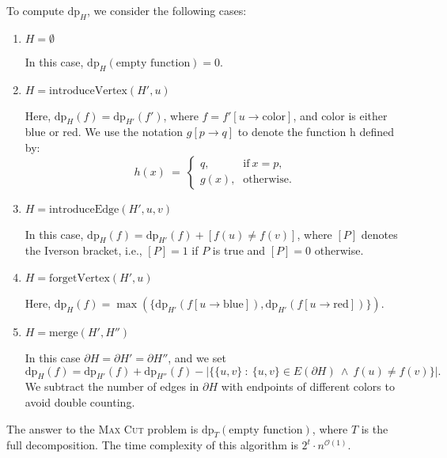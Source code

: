 \documentclass[12pt]{article}
\begin{document}
	\medskip
	
	To compute \(\text{dp}_{H}\), we consider the following cases:
	\begin{enumerate}
		\item \(H = \emptyset\)
		      
		      In this case, \(\text{dp}_{H}(\text{empty function}) = 0\).
		
		\item \(H = \text{introduceVertex}(H', u)\)
		      
		      Here, \(\text{dp}_{H}(f) = \text{dp}_{H'}(f')\), where \(f =
		      f'[u \to \text{color}]\), and color is either blue or red. We use
		      the notation \(g[p \to q]\) to denote the function h defined by:
		      \[ h(x) \ = \ \begin{cases} q \text{,} & \text{if} \ x = p
		      \text{,} \\
		      g(x) \text{,} & \text{otherwise.} \end{cases} \]
		
		\item \(H = \text{introduceEdge}(H', u, v)\)
		      
		      In this case, \(\text{dp}_{H}(f) = \text{dp}_{H'}(f) + [f(u) \neq
		      f(v)]\), where \([P]\) denotes the Iverson bracket, i.e., \([P] =
		      1\) if \(P\) is true and \([P] = 0\) otherwise.
		
		\item \(H = \text{forgetVertex}(H', u)\)
		      
		      Here, \(\text{dp}_{H}(f) = \max(\{
		      \text{dp}_{H'}(f[u \to \text{blue}]),
		      \text{dp}_{H'}(f[u \to \text{red}])\})\).
		
		\item \(H = \text{merge}(H', H'')\)
		      
		      In this case \(\partial H = \partial H' = \partial H''\), and we
		      set
		      \[ \text{dp}_{H}(f) = \text{dp}_{H'}(f) + \text{dp}_{H''}(f) -
		      |\{\{u, v\} \ : \ \{u, v\} \in E(\partial H) \ \wedge \ f(u) \neq
		      f(v)\}| \text{.} \]
		      We subtract the number of edges in \(\partial H\) with endpoints
		      of different colors to avoid double counting.
	\end{enumerate}
	The answer to the \textsc{Max Cut} problem is
	\(\text{dp}_{T}(\text{empty function})\), where \(T\) is the full
	decomposition. The time complexity of this algorithm is \(2^{t} \cdot
	n^{\mathcal{O}(1)}\).
	
	\medskip
	
\end{document}
